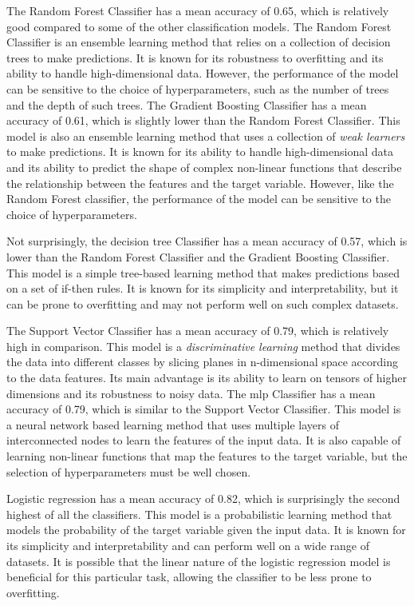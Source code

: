 \documentclass[a4paper, 12pt]{report}
\begin{document}
The Random Forest Classifier has a mean accuracy of 0.65, which is relatively good compared to some of the other classification models. The Random Forest Classifier is an \gls{ensemble learning method} that relies on a collection of \glspl{decision tree} to make predictions. It is known for its robustness to \gls{overfitting} and its ability to handle high-dimensional data. However, the performance of the model can be sensitive to the choice of hyperparameters, such as the number of trees and the depth of such trees. The Gradient Boosting Classifier has a mean accuracy of 0.61, which is slightly lower than the Random Forest Classifier. This model is also an \gls{ensemble learning method} that uses a collection of \textit{weak learners} to make predictions. It is known for its ability to handle high-dimensional data and its ability to predict the shape of complex non-linear functions that describe the relationship between the features and the target variable. However, like the Random Forest classifier, the performance of the model can be sensitive to the choice of hyperparameters.

Not surprisingly, the \Gls{decision tree} Classifier has a mean accuracy of 0.57, which is lower than the Random Forest Classifier and the Gradient Boosting Classifier. This model is a simple tree-based learning method that makes predictions based on a set of if-then rules. It is known for its simplicity and interpretability, but it can be prone to \gls{overfitting} and may not perform well on such complex datasets.

The Support Vector Classifier has a mean accuracy of 0.79, which is relatively high in comparison. This model is a \textit{discriminative learning} method that divides the data into different classes by slicing planes in n-dimensional space according to the data features. Its main advantage is its ability to learn on tensors of higher dimensions and its robustness to noisy data. The \acrshort{mlp} Classifier has a mean accuracy of 0.79, which is similar to the Support Vector Classifier. This model is a neural network based learning method that uses multiple layers of interconnected nodes to learn the features of the input data. It is also capable of learning non-linear functions that map the features to the target variable, but the selection of hyperparameters must be well chosen.

Logistic regression has a mean accuracy of 0.82, which is surprisingly the second highest of all the classifiers. This model is a probabilistic learning method that models the probability of the target variable given the input data. It is known for its simplicity and interpretability and can perform well on a wide range of datasets. It is possible that the linear nature of the logistic regression model is beneficial for this particular task, allowing the classifier to be less prone to \gls{overfitting}. 
\end{document}
